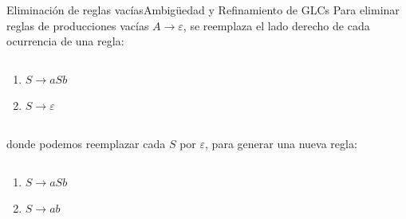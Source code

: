 \documentclass[spanish, handout]{beamer}
\begin{document}
\begin{frame}{Eliminación de reglas vacías}{Ambigüedad y Refinamiento de GLCs}
    Para eliminar reglas de producciones vacías $A \to \varepsilon$, se reemplaza el lado derecho de cada ocurrencia de una regla: \pause

    \bigskip

    \begin{columns}
        \begin{column}{0.5\textwidth}
            \begin{enumerate}
                \item $S \to aSb$
                \item $S \to \varepsilon$
            \end{enumerate} \pause
        \end{column}
        \begin{column}{0.5\textwidth}
        \end{column}
    \end{columns}

    \bigskip

    donde podemos reemplazar cada $S$ por $\varepsilon$, para generar una nueva regla: \pause

    \bigskip

    \begin{columns}
        \begin{column}{0.5\textwidth}
            \begin{enumerate}
                \item $S \to aSb$
                \item $S \to ab$
            \end{enumerate} \pause
        \end{column}
        \begin{column}{0.5\textwidth}
        \end{column}
    \end{columns}

    \bigskip




\end{frame}
\end{document}
